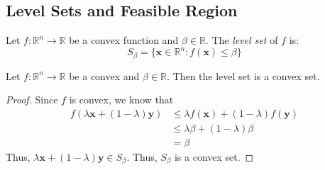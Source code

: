 \subsection{Level Sets and Feasible Region}
\begin{defbox}
    \begin{definition}
        Let $ f:\mathbb{R}^n\to\mathbb{R} $ be a convex function
        and $ \beta\in\mathbb{R} $. The \emph{level set}
        of $ f $ is:
        \[ S_\beta = \{\bm{x}\in\mathbb{R}^n:f(\bm{x})\leqslant \beta\} \]
    \end{definition}
\end{defbox}

\begin{thmbox}
    \begin{theorem}
        Let $ f:\mathbb{R}^n\to\mathbb{R} $ be a convex and $ \beta\in\mathbb{R} $. Then the level set
        is a convex set.
    \end{theorem}
\end{thmbox}

\begin{proof}
    Since $ f $ is convex, we know that
    \begin{align*}
        f(\lambda\bm{x} + (1-\lambda)\bm{y})
         & \leqslant \lambda f(\bm{x})+(1-\lambda)f(\bm{y}) \\
         & \leqslant\lambda\beta + (1-\lambda)\beta         \\
         & =\beta
    \end{align*}
    Thus, $ \lambda \bm{x} + (1-\lambda)\bm{y}\in S_\beta $. Thus, $ S_\beta $ is a convex
    set.
\end{proof}
